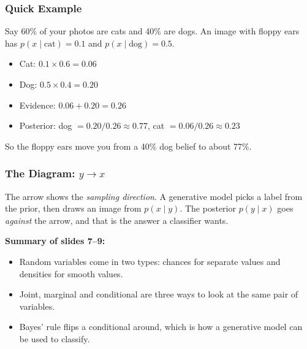 \subsubsection*{Quick Example}

Say 60\% of your photos are cats and 40\% are dogs. An image with floppy ears has $p(x \mid \text{cat}) = 0.1$ and $p(x \mid \text{dog}) = 0.5$.

\begin{itemize}
  \item Cat: $0.1 \times 0.6 = 0.06$
  \item Dog: $0.5 \times 0.4 = 0.20$
  \item Evidence: $0.06 + 0.20 = 0.26$
  \item Posterior: dog $= 0.20 / 0.26 \approx \mathbf{0.77}$, cat $= 0.06 / 0.26 \approx \mathbf{0.23}$
\end{itemize}

So the floppy ears move you from a 40\% dog belief to about 77\%.

\subsubsection*{The Diagram: $y \rightarrow x$}

The arrow shows the \textit{sampling direction}. A generative model picks a label from the prior, then draws an image from $p(x \mid y)$. The posterior $p(y \mid x)$ goes \textit{against} the arrow, and that is the answer a classifier wants.

\textbf{Summary of slides 7--9:}

\begin{itemize}
  \item Random variables come in two types: chances for separate values and densities for smooth values.
  \item Joint, marginal and conditional are three ways to look at the same pair of variables.
  \item Bayes' rule flips a conditional around, which is how a generative model can be used to classify.
\end{itemize}